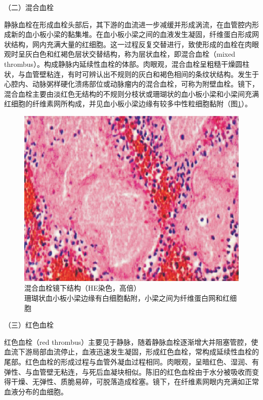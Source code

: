 {（二）混合血栓}

静脉血栓在形成血栓头部后，其下游的血流进一步减缓并形成涡流，在血管腔内形成新的血小板小梁的黏集堆。在血小板小梁之间的血液发生凝固，纤维蛋白形成网状结构，网内充满大量的红细胞。这一过程反复交替进行，致使形成的血栓在肉眼观时呈灰白色和红褐色层状交替结构，称为层状血栓，即混合血栓（mixed
thrombus）。构成静脉内延续性血栓的体部。肉眼观，混合血栓呈粗糙干燥圆柱状，与血管壁粘连，有时可辨认出不规则的灰白和褐色相间的条纹状结构。发生于心腔内、动脉粥样硬化溃疡部位或动脉瘤内的混合血栓，可称为附壁血栓。镜下，混合血栓主要由淡红色无结构的不规则分枝状或珊瑚状的血小板小梁和小梁间充满红细胞的纤维素网所构成，并见血小板小梁边缘有较多中性粒细胞黏附（图\ref{fig3-7}）。

\begin{figure}[!htbp]
\centering
\includegraphics{./images/Image00040.jpg}
\captionsetup{justification=centering}
\caption{混合血栓镜下结构（HE染色，高倍） \\ {\small 珊瑚状血小板小梁边缘有白细胞黏附，小梁之间为纤维蛋白网和红细胞}}
\label{fig3-7} 
\end{figure} 

{（三）红色血栓}

红色血栓（red
thrombus）主要见于静脉，随着静脉血栓逐渐增大并阻塞管腔，使血流下游局部血流停止，血液迅速发生凝固，形成红色血栓，常构成延续性血栓的尾部。红色血栓的形成过程与血管外凝血过程相同。肉眼观，呈暗红色、湿润、有弹性、与血管壁无粘连，与死后血凝块相似。陈旧的红色血栓由于水分被吸收而变得干燥、无弹性、质脆易碎，可脱落造成栓塞。镜下，在纤维素网眼内充满如正常血液分布的血细胞。

